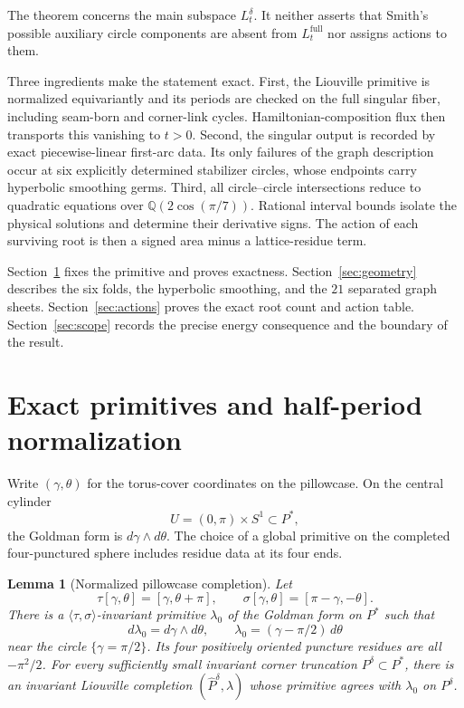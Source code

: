\documentclass[11pt,reqno]{amsart}
\theoremstyle{plain}
\newtheorem{lemma}[theorem]{Lemma}
\theoremstyle{definition}
\begin{document}
The theorem concerns the main subspace $L_t^\delta$.  It neither asserts that Smith's possible
auxiliary circle components are absent from $L_t^{\mathrm{full}}$ nor assigns actions to them.

Three ingredients make the statement exact.  First, the Liouville primitive is normalized
equivariantly and its periods are checked on the full singular fiber, including seam-born and
corner-link cycles.  Hamiltonian-composition flux then transports this vanishing to $t>0$.
Second, the singular output is recorded by exact piecewise-linear first-arc data.  Its only
failures of the graph description occur at six explicitly determined stabilizer circles, whose
endpoints carry hyperbolic smoothing germs.  Third, all circle--circle intersections reduce to quadratic
equations over $\mathbb Q(2\cos(\pi/7))$.  Rational interval bounds isolate the physical solutions
and determine their derivative signs.  The action of each surviving root is then a signed area
minus a lattice-residue term.

Section~\ref{sec:exactness} fixes the primitive and proves exactness.  Section~\ref{sec:geometry}
describes the six folds, the hyperbolic smoothing, and the $21$ separated graph sheets.
Section~\ref{sec:actions} proves the exact root count and action table.
Section~\ref{sec:scope} records the precise energy consequence and the boundary of the result.

\section{Exact primitives and half-period normalization}\label{sec:exactness}

Write $(\gamma,\theta)$ for the torus-cover coordinates on the pillowcase.  On the central
cylinder
\[
 U=(0,\pi)\times S^1\subset P^*,
\]
the Goldman form is $d\gamma\wedge d\theta$.  The choice of a global primitive on the completed
four-punctured sphere includes residue data at its four ends.

\begin{lemma}[Normalized pillowcase completion]\label{lem:normalized-primitive}
Let
\[
 \tau[\gamma,\theta]=[\gamma,\theta+\pi],
 \qquad
 \sigma[\gamma,\theta]=[\pi-\gamma,-\theta].
\]
There is a $\langle\tau,\sigma\rangle$-invariant primitive $\lambda_0$ of the Goldman form on
$P^*$ such that
\[
 d\lambda_0=d\gamma\wedge d\theta,
 \qquad
 \lambda_0=(\gamma-\pi/2)\,d\theta
\]
near the circle $\{\gamma=\pi/2\}$.  Its four positively oriented puncture residues are all
$-\pi^2/2$.  For every sufficiently small invariant corner truncation
$P^\delta\subset P^*$, there is an invariant Liouville completion
$(\widehat P^\delta,\lambda)$ whose primitive agrees with $\lambda_0$ on $P^\delta$.
\end{lemma}
\end{document}
